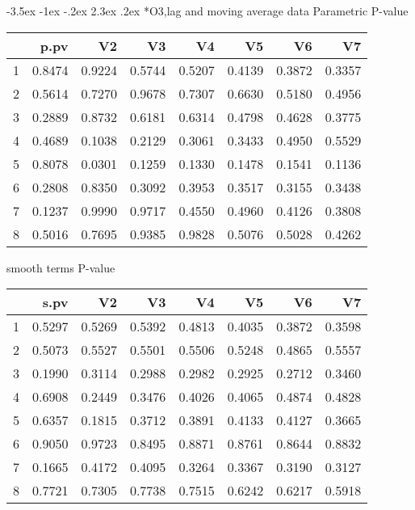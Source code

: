 \documentclass[a4paper, 12pt]{article}
\makeatletter
\def\Large{\fontsize{16}{24}\selectfont}
\renewcommand\section{\@startsection {section}{1}{\z@}%
                                   {-3.5ex \@plus -1ex \@minus -.2ex}%
                                   {2.3ex \@plus.2ex}%
                                   {\centering\normalfont\Large\bfseries}}
\makeatother
\begin{document}
\clearpage
\section*{O3,lag and moving average data}
Parametric P-value
\begin{table}[ht]
\centering
\begin{tabular}{rrrrrrrr}
  \hline
 & p.pv & V2 & V3 & V4 & V5 & V6 & V7 \\
  \hline
1 & 0.8474 & 0.9224 & 0.5744 & 0.5207 & 0.4139 & 0.3872 & 0.3357 \\
  2 & 0.5614 & 0.7270 & 0.9678 & 0.7307 & 0.6630 & 0.5180 & 0.4956 \\
  3 & 0.2889 & 0.8732 & 0.6181 & 0.6314 & 0.4798 & 0.4628 & 0.3775 \\
  4 & 0.4689 & 0.1038 & 0.2129 & 0.3061 & 0.3433 & 0.4950 & 0.5529 \\
  5 & 0.8078 & 0.0301 & 0.1259 & 0.1330 & 0.1478 & 0.1541 & 0.1136 \\
  6 & 0.2808 & 0.8350 & 0.3092 & 0.3953 & 0.3517 & 0.3155 & 0.3438 \\
  7 & 0.1237 & 0.9990 & 0.9717 & 0.4550 & 0.4960 & 0.4126 & 0.3808 \\
  8 & 0.5016 & 0.7695 & 0.9385 & 0.9828 & 0.5076 & 0.5028 & 0.4262 \\
   \hline
\end{tabular}
\end{table}

smooth terms P-value
\begin{table}[ht]
\centering
\begin{tabular}{rrrrrrrr}
  \hline
 & s.pv & V2 & V3 & V4 & V5 & V6 & V7 \\
  \hline
1 & 0.5297 & 0.5269 & 0.5392 & 0.4813 & 0.4035 & 0.3872 & 0.3598 \\
  2 & 0.5073 & 0.5527 & 0.5501 & 0.5506 & 0.5248 & 0.4865 & 0.5557 \\
  3 & 0.1990 & 0.3114 & 0.2988 & 0.2982 & 0.2925 & 0.2712 & 0.3460 \\
  4 & 0.6908 & 0.2449 & 0.3476 & 0.4026 & 0.4065 & 0.4874 & 0.4828 \\
  5 & 0.6357 & 0.1815 & 0.3712 & 0.3891 & 0.4133 & 0.4127 & 0.3665 \\
  6 & 0.9050 & 0.9723 & 0.8495 & 0.8871 & 0.8761 & 0.8644 & 0.8832 \\
  7 & 0.1665 & 0.4172 & 0.4095 & 0.3264 & 0.3367 & 0.3190 & 0.3127 \\
  8 & 0.7721 & 0.7305 & 0.7738 & 0.7515 & 0.6242 & 0.6217 & 0.5918 \\
   \hline
\end{tabular}
\end{table}
\clearpage
\end{document}
